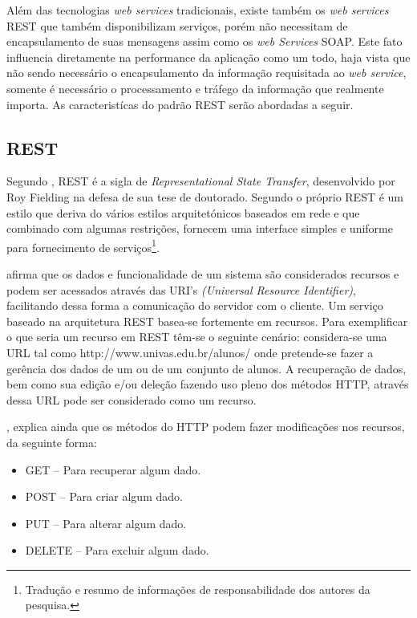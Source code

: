 	\par Além das tecnologias \textit{web services} tradicionais, existe também os
\textit{web services} REST que também disponibilizam serviços, porém não
necessitam de encapsulamento de suas mensagens assim como os \textit{web
Services} SOAP. Este fato influencia diretamente na performance da aplicação
como um todo, haja vista que não sendo necessário o encapsulamento da informação
requisitada ao \textit{web service}, somente é necessário o processamento e
tráfego da informação que realmente importa. As caracteristícas do padrão REST
serão abordadas a seguir.

	\subsection{REST}
	
	\par Segundo , REST é a sigla de
\textit{Representational State Transfer}, desenvolvido por Roy Fielding na
defesa de sua tese de doutorado. Segundo o próprio 
REST é um estilo que deriva do vários estilos arquitetónicos baseados em rede
e  que combinado com algumas restrições, fornecem uma interface simples e
uniforme para fornecimento de serviços\footnote{Tradução e resumo de
informações de responsabilidade dos autores da pesquisa.}.
	
	\par {} afirma que os dados e funcionalidade de um sistema
são considerados recursos e podem ser acessados através das URI's
\textit{(Universal Resource Identifier)}, facilitando dessa forma a comunicação
do servidor com o cliente. Um serviço baseado na arquitetura REST
basea-se fortemente em recursos. Para exemplificar o que seria um recurso em
REST têm-se o seguinte cenário: considera-se uma URL tal como 
http://www.univas.edu.br/alunos/ onde pretende-se fazer a gerência dos dados
de um ou de um conjunto de alunos. A recuperação de dados, bem como sua edição
e/ou deleção fazendo uso pleno dos métodos HTTP, através dessa URL pode ser
considerado como um recurso.
	\par {}, explica ainda que os métodos do HTTP podem fazer
modificações nos recursos, da seguinte forma:
	
	 \begin{itemize}
	   \item GET – Para recuperar algum dado. 
	   \item POST – Para criar algum dado.
	   \item PUT – Para alterar algum dado. 
	   \item DELETE – Para excluir algum dado. 
	 \end{itemize}
	 	
